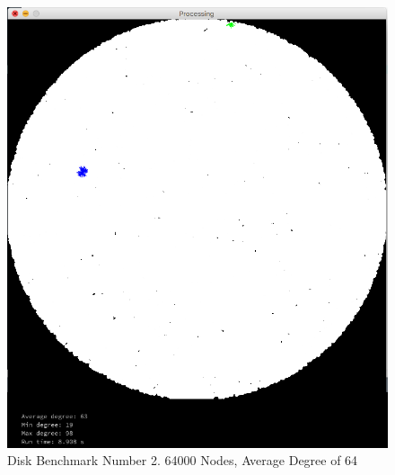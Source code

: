 \documentclass{article}
\begin{document}
\begin{center}
    \begin{figure}
        \includegraphics[scale=0.45]{./images/disk_1.png}
        \caption{Disk Benchmark Number 2. 64000 Nodes, Average Degree of 64}
        \label{disk1}
    \end{figure}
\end{center}
\end{document}
